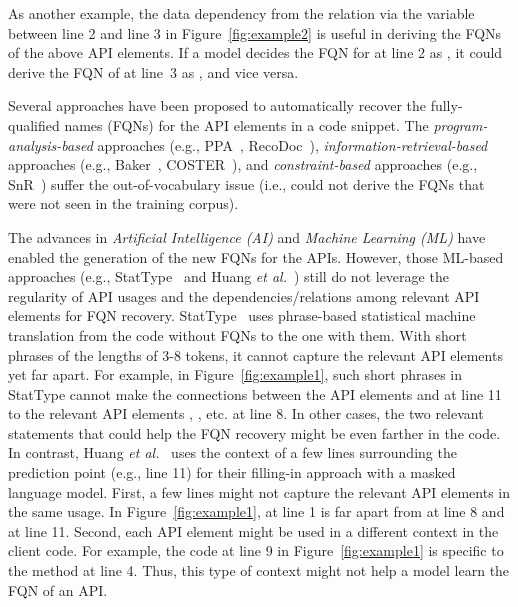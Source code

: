 As another example, the data dependency from the 
relation via the variable  between line 2 and line 3 in
Figure~\ref{fig:example2} is useful in deriving the FQNs of the
above API elements. If a model decides the FQN for  at
line 2 as , it
could derive the FQN of  at line~3 as
,
and vice versa.

\vspace{2pt}
 Several approaches have
been proposed to automatically recover the fully-qualified names
(FQNs) for the API elements in a code snippet. The {\em
  program-analysis-based} approaches (e.g.,
PPA~\cite{dagenais-oopsla08}, RecoDoc~\cite{dagenais-icse12}), {\em
  information-retrieval-based} approaches (e.g.,
Baker~\cite{liveapi14}, COSTER~\cite{coster-ase19}), and {\em
  constraint-based} approaches (e.g., SnR~\cite{snr-icse22}) suffer
the out-of-vocabulary issue (i.e., could not derive the FQNs that were
not seen in the training corpus).

The advances in {\em Artificial Intelligence (AI)} and {\em Machine
  Learning (ML)} have enabled the generation of the new FQNs for the
APIs. However, those ML-based approaches (e.g., StatType~\cite{icse18}
and Huang {\em et al.}~\cite{prompt-ase22}) still do not leverage the
regularity of API usages and the dependencies/relations among relevant
API elements for FQN recovery. StatType~\cite{icse18} uses
phrase-based statistical machine translation from the code without
FQNs to the one with them.  With short phrases of the lengths of 3-8
tokens, it cannot capture the relevant API elements yet far apart. For
example, in Figure~\ref{fig:example1}, such short phrases in StatType
cannot make the connections between the API elements 
and  at line 11 to the relevant API elements
, , etc. at line 8. In other cases,
the two relevant statements that could help the FQN recovery might be
even farther in the code. In contrast, Huang {\em et
  al.}~\cite{prompt-ase22} uses the context of a few lines surrounding
the prediction point (e.g., line 11) for their filling-in approach
with a masked language model. First, a few lines might not capture the
relevant API elements in the same usage. In Figure~\ref{fig:example1},
 at line 1 is far apart from  at line 8
and  at line 11. Second, each API element might be used
in a different context in the client code. For example, the code at
line 9 in Figure~\ref{fig:example1} is specific to the method
 at line 4. Thus, this type of context might not help a
model learn the FQN of an API.


